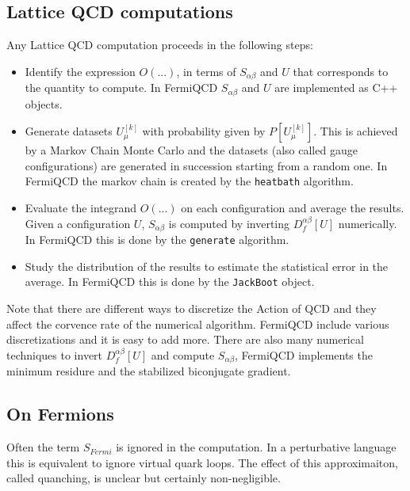 \subsection{Lattice QCD computations}

Any Lattice QCD computation proceeds in the following steps:

\begin{itemize}
\item  Identify the expression $O(...)$, in terms of $S_{\alpha \beta }$ and 
$U$ that corresponds to the quantity to compute. In FermiQCD $S_{\alpha
\beta }$ and $U$ are implemented as C++ objects.

\item  Generate datasets $U_\mu ^{[k]}$ with probability given by $P[U_\mu
^{[k]}]$. This is achieved by a Markov Chain Monte Carlo and the datasets
(also called gauge configurations) are generated in succession starting from
a random one. In FermiQCD the markov chain is created by the {\tt heatbath}
algorithm.

\item  Evaluate the integrand $O(...)$ on each configuration and average the
results. Given a configuration $U$, $S_{\alpha \beta }$ is computed by
inverting $D_f^{\alpha \beta }[U]$ numerically. In FermiQCD this is done by
the {\tt generate} algorithm.

\item  Study the distribution of the results to estimate the statistical
error in the average. In FermiQCD this is done by the {\tt JackBoot} object.
\end{itemize}

Note that there are different ways to discretize the Action of QCD and they
affect the corvence rate of the numerical algorithm. FermiQCD include
various discretizations and it is easy to add more. There are also many
numerical techniques to invert $D_f^{\alpha \beta }[U]$ and compute $%
S_{\alpha \beta }$, FermiQCD implements the minimum residure and the
stabilized biconjugate gradient.

\subsection{On Fermions}

Often the term $S_{Fermi}$ is ignored in the computation. In a perturbative
language this is equivalent to ignore virtual quark loops. The effect of
this approximaiton, called quanching, is unclear but certainly
non-negligible.

